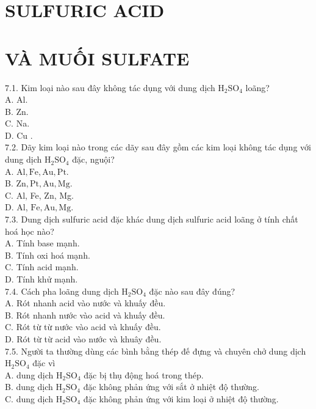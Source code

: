 \documentclass[10pt]{article}
\begin{document}
\section*{SULFURIC ACID}
\section*{VÀ MUỐI SULFATE}
7.1. Kim loại nào sau đây không tác dụng với dung dịch $\mathrm{H}_{2} \mathrm{SO}_{4}$ loãng?\\
A. Al.\\
B. Zn.\\
C. Na.\\
D. Cu .\\
7.2. Dãy kim loại nào trong các dãy sau đây gồm các kim loại không tác dụng với dung dịch $\mathrm{H}_{2} \mathrm{SO}_{4}$ đặc, nguội?\\
A. $\mathrm{Al}, \mathrm{Fe}, \mathrm{Au}, \mathrm{Pt}$.\\
B. $\mathrm{Zn}, \mathrm{Pt}, \mathrm{Au}, \mathrm{Mg}$.\\
C. Al, Fe, Zn, Mg.\\
D. Al, $\mathrm{Fe}, \mathrm{Au}, \mathrm{Mg}$.\\
7.3. Dung dịch sulfuric acid đặc khác dung dịch sulfuric acid loãng ở tính chất hoá học nào?\\
A. Tính base mạnh.\\
B. Tính oxi hoá mạnh.\\
C. Tính acid mạnh.\\
D. Tính khử mạnh.\\
7.4. Cách pha loãng dung dịch $\mathrm{H}_{2} \mathrm{SO}_{4}$ đặc nào sau đây đúng?\\
A. Rót nhanh acid vào nước và khuấy đều.\\
B. Rót nhanh nước vào acid và khuấy đều.\\
C. Rót từ từ nước vào acid và khuấy đều.\\
D. Rót từ từ acid vào nước và khuây đều.\\
7.5. Người ta thường dùng các bình bằng thép đế đựng và chuyên chở dung dịch $\mathrm{H}_{2} \mathrm{SO}_{4}$ đặc vì\\
A. dung dịch $\mathrm{H}_{2} \mathrm{SO}_{4}$ đặc bị thụ động hoá trong thép.\\
B. dung dịch $\mathrm{H}_{2} \mathrm{SO}_{4}$ đặc không phản ứng với sắt ở nhiệt độ thường.\\
C. dung dịch $\mathrm{H}_{2} \mathrm{SO}_{4}$ đặc không phản ứng với kim loại ở nhiệt độ thường.\\
\end{document}
